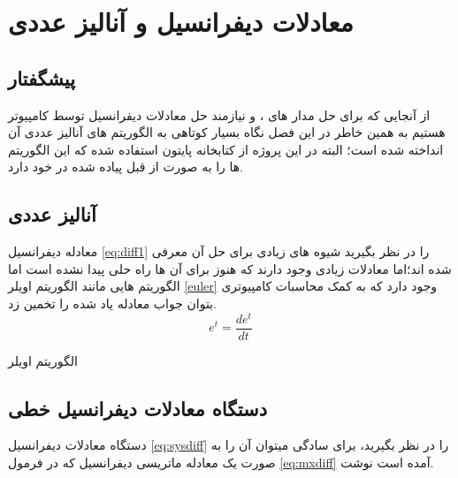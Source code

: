 \chapter{معادلات دیفرانسیل و آنالیز عددی}
\label{chap:linalgb}
\section{پیشگفتار} 
از آنجایی که برای حل مدار های
،
و
نیازمند حل معادلات دیفرانسیل توسط کامپیوتر هستیم به همین خاطر در این فصل نگاه بسیار کوتاهی به الگوریتم های آنالیز عددی آن انداخته شده است؛ البته در این پروژه از کتابخانه
 پایتون استفاده شده که این الگوریتم ها را به صورت از قبل پیاده شده در خود دارد.
\section{آنالیز عددی}
معادله دیفرانسیل
\ref{eq:diff1}
را در نظر بگیرید شیوه های زیادی برای حل آن معرفی شده اند؛اما معادلات زیادی وجود دارند که هنوز برای آن ها راه حلی پیدا نشده است اما الگوریتم هایی مانند الگوریتم اویلر 
\ref{euler}
وجود دارد که به کمک محاسبات کامپیوتری بتوان جواب معادله یاد شده را تخمین زد.
\cite{mirzaee14}
\begin{equation}\label{eq:diff1}
	e^t=\frac{de^t}{dt}
\end{equation}


\begin{algorithm}[ht]
	\onehalfspacing
	\caption{الگوریتم اویلر
	} 
	\label{euler}
	\begin{algorithmic}[1]
		\REQUIRE
		\ENSURE
		\STATE
		\STATE
		\STATE
		\STATE
		\STATE
		\STATE
		
	\end{algorithmic}
\end{algorithm}

\section{دستگاه معادلات دیفرانسیل خطی}
دستگاه معادلات دیفرانسیل 
\ref{eq:sysdiff}
را در نظر بگیرید، برای سادگی میتوان آن را به صورت یک معادله ماتریسی دیفرانسیل که در فرمول
\ref{eq:mxdiff}
آمده است نوشت.

